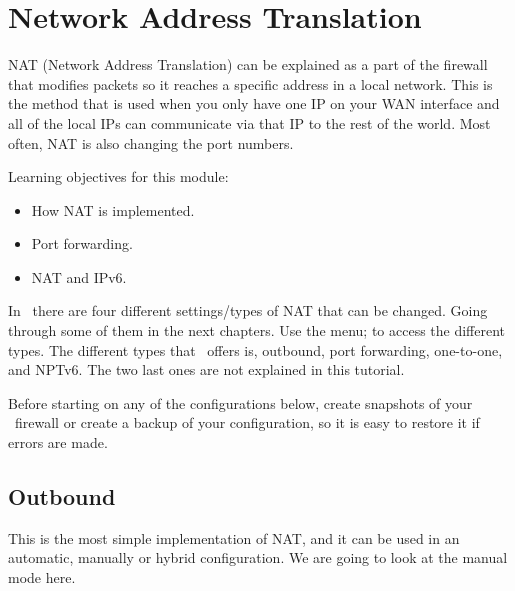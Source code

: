 \newpage

\section{Network Address Translation}
NAT (Network Address Translation) can be explained as a part of the firewall that modifies packets so it reaches a specific address in a local network. This is the method that is used when you only have one IP on your WAN interface and all of the local IPs can communicate via that IP to the rest of the world. Most often, NAT is also changing the port numbers.

Learning objectives for this module:
\begin{itemize}
    \item How NAT is implemented.
    \item Port forwarding.
    \item NAT and IPv6.
\end{itemize}

In \opnsense\, there are four different settings/types of NAT that can be changed. Going through some of them in the next chapters. Use the menu;  to access the different types. The different types that \opnsense\ offers is, outbound, port forwarding, one-to-one, and NPTv6. The two last ones are not explained in this tutorial.


\begin{importantblock}
    Before starting on any of the configurations below, create snapshots of your \opnsense\ firewall or create a backup of your configuration, so it is easy to restore it if errors are made.
\end{importantblock}

\subsection{Outbound}\label{outbound}
This is the most simple implementation of NAT, and it can be used in an automatic, manually or hybrid configuration. We are going to look at the manual mode here.

